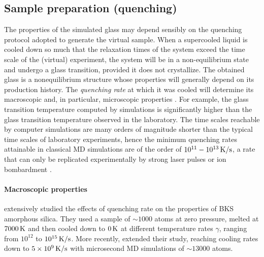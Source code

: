 \subsection{Sample preparation (quenching)}  \label{sec:silica-quenching}
The properties of the simulated glass may depend sensibly on the quenching protocol adopted to generate the virtual sample. 
When a supercooled liquid is cooled down so much that the relaxation times of the system exceed the time scale of the (virtual) experiment, the system will be in a non-equilibrium state and undergo a glass transition, provided it does not crystallize. The obtained glass is a nonequilibrium structure whose properties will generally depend on its production history. The \emph{quenching rate} at which it was cooled will determine its macroscopic and, in particular, microscopic properties \cite{Vollmayr1996}. 
For example, the glass transition temperature computed by simulations is significantly higher than the glass transition temperature observed in the laboratory. 
The time scales reachable by computer simulations are many orders of magnitude shorter than the typical time scales of laboratory experiments, hence the minimum quenching rates attainable in classical MD simulations are of the order of $10^{11}-10^{13}\,\mathrm{K/s}$, a rate that can only be replicated experimentally by strong laser pulses or ion bombardment \cite{Soules2011}.

\paragraph{Macroscopic properties}
\citet{Vollmayr1996} extensively studied the effects of quenching rate on the properties of BKS amorphous silica. They used a sample of $\sim 1000$ atoms at zero pressure, melted at $7000\,\mathrm{K}$ and then cooled down to $0\,\mathrm{K}$ at different temperature rates $\gamma$, ranging from $10^{12}$ to $10^{15}\,\mathrm{K/s}$. More recently, \citet{Lane2015} extended their study, reaching cooling rates down to $5\times 10^{9}\,\mathrm{K/s}$ with microsecond MD simulations of $\sim 13000$ atoms.

